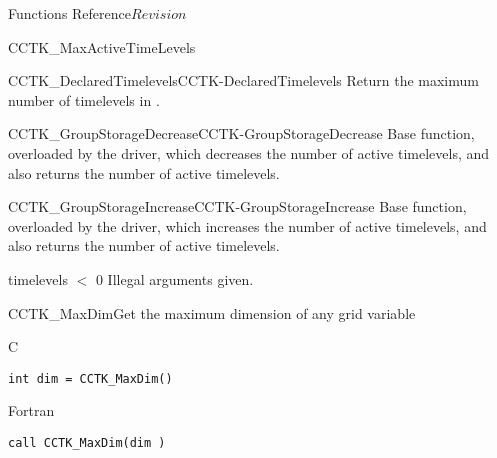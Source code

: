 \begin{cactuspart}{ Functions Reference}{}{$Revision$}
\begin{FunctionDescription}{CCTK\_MaxActiveTimeLevels}
\begin{SeeAlsoSection}
\begin{SeeAlso2}{CCTK\_DeclaredTimelevels}{CCTK-DeclaredTimelevels}
Return the maximum number of timelevels in .
\end{SeeAlso2}
\begin{SeeAlso2}{CCTK\_GroupStorageDecrease}{CCTK-GroupStorageDecrease}
Base function, overloaded by the driver, which decreases the number of
active timelevels, and also returns the number of active timelevels.
\end{SeeAlso2}
\begin{SeeAlso2}{CCTK\_GroupStorageIncrease}{CCTK-GroupStorageIncrease}
Base function, overloaded by the driver, which increases the number of
active timelevels, and also returns the number of active timelevels.
\end{SeeAlso2}
\end{SeeAlsoSection}

\begin{ErrorSection}
\begin{Error}{timelevels $<$ 0}
Illegal arguments given.
\end{Error}
\end{ErrorSection}

\end{FunctionDescription}



\begin{FunctionDescription}{CCTK\_MaxDim}{Get the maximum dimension of any grid variable }
\label{CCTK-MaxDim}
\begin{SynopsisSection}
\begin{Synopsis}{C}
\begin{verbatim}int dim = CCTK_MaxDim()\end{verbatim}
\end{Synopsis}
\begin{Synopsis}{Fortran}
\begin{verbatim}call CCTK_MaxDim(dim )


\end{verbatim}
\end{Synopsis}
\end{SynopsisSection}
\end{FunctionDescription}
\end{cactuspart}
